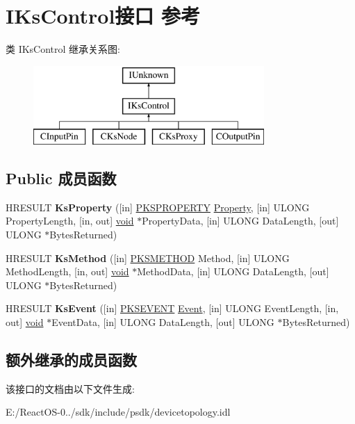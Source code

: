 \hypertarget{interface_i_ks_control}{}\section{I\+Ks\+Control接口 参考}
\label{interface_i_ks_control}
类 I\+Ks\+Control 继承关系图\+:\begin{figure}[H]
\begin{center}
\leavevmode
\includegraphics[height=3.000000cm]{interface_i_ks_control}
\end{center}
\end{figure}
\subsection*{Public 成员函数}
\begin{DoxyCompactItemize}
\item 
\mbox{\label{interface_i_ks_control_a08b977347a8d49e542f127a4a8d589e4}} 
H\+R\+E\+S\+U\+LT {\bfseries Ks\+Property} (\mbox{[}in\mbox{]} \hyperlink{struct_k_s_i_d_e_n_t_i_f_i_e_r}{P\+K\+S\+P\+R\+O\+P\+E\+R\+TY} \hyperlink{struct_property}{Property}, \mbox{[}in\mbox{]} U\+L\+O\+NG Property\+Length, \mbox{[}in, out\mbox{]} \hyperlink{interfacevoid}{void} $\ast$Property\+Data, \mbox{[}in\mbox{]} U\+L\+O\+NG Data\+Length, \mbox{[}out\mbox{]} U\+L\+O\+NG $\ast$Bytes\+Returned)
\item 
\mbox{\label{interface_i_ks_control_a304a49ef620ae8ddcc5838810a35c5c9}} 
H\+R\+E\+S\+U\+LT {\bfseries Ks\+Method} (\mbox{[}in\mbox{]} \hyperlink{struct_k_s_i_d_e_n_t_i_f_i_e_r}{P\+K\+S\+M\+E\+T\+H\+OD} Method, \mbox{[}in\mbox{]} U\+L\+O\+NG Method\+Length, \mbox{[}in, out\mbox{]} \hyperlink{interfacevoid}{void} $\ast$Method\+Data, \mbox{[}in\mbox{]} U\+L\+O\+NG Data\+Length, \mbox{[}out\mbox{]} U\+L\+O\+NG $\ast$Bytes\+Returned)
\item 
\mbox{\label{interface_i_ks_control_abfb761c366e1fdabad1dbfe4398596b8}} 
H\+R\+E\+S\+U\+LT {\bfseries Ks\+Event} (\mbox{[}in\mbox{]} \hyperlink{struct_k_s_i_d_e_n_t_i_f_i_e_r}{P\+K\+S\+E\+V\+E\+NT} \hyperlink{struct_event}{Event}, \mbox{[}in\mbox{]} U\+L\+O\+NG Event\+Length, \mbox{[}in, out\mbox{]} \hyperlink{interfacevoid}{void} $\ast$Event\+Data, \mbox{[}in\mbox{]} U\+L\+O\+NG Data\+Length, \mbox{[}out\mbox{]} U\+L\+O\+NG $\ast$Bytes\+Returned)
\end{DoxyCompactItemize}
\subsection*{额外继承的成员函数}


该接口的文档由以下文件生成\+:\begin{DoxyCompactItemize}
\item 
E\+:/\+React\+O\+S-\/0../sdk/include/psdk/devicetopology.\+idl\end{DoxyCompactItemize}
